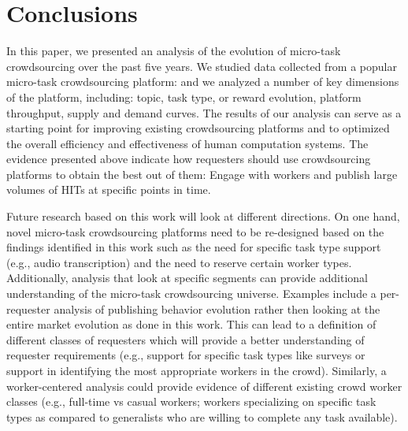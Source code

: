 \section{Conclusions}\label{sec:conc}

In this paper, we presented an analysis of the evolution of micro-task crowdsourcing over the past five years.
We studied data collected from a popular micro-task crowdsourcing platform: \amt{}
and we analyzed a number of key dimensions of the platform, including: topic, task type, or reward evolution, platform throughput, supply and demand curves. The results of our analysis can serve as a starting point for improving existing crowdsourcing platforms and to optimized the overall efficiency and effectiveness of human computation systems. The evidence presented above  indicate how requesters should use crowdsourcing platforms to obtain the best out of them: Engage with workers and publish large volumes of HITs at specific points in time. 


Future research based on this work will look at different directions. On one hand, novel micro-task crowdsourcing platforms need to be re-designed based on the findings identified in this work such as the need for specific task type support (e.g., audio transcription) and the need to reserve certain worker types.
% 
Additionally, analysis that look at specific segments can provide additional understanding of the micro-task crowdsourcing universe. Examples include a per-requester analysis of publishing behavior evolution rather then looking at the entire market evolution as done in this work. This can lead to a definition of different classes of requesters which will provide a better understanding of requester requirements (e.g., support for specific task types like surveys or support in identifying the most appropriate workers in the crowd). Similarly, a worker-centered analysis could provide evidence of different existing crowd worker classes (e.g., full-time vs casual workers; workers specializing on specific task types as compared to generalists  who are willing to complete any task available).